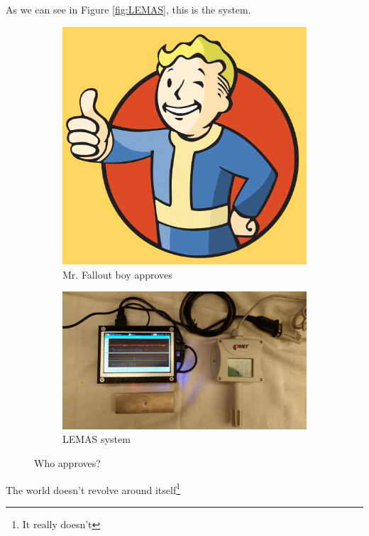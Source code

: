 \documentclass{article}
\begin{document}
  As we can see in Figure \ref{fig:LEMAS}, this is the system.

  \begin{figure}
    \centering
    \begin{subfigure}{0.3\linewidth}
      \includegraphics[width=\linewidth]{figures/fallout.jpeg}
      \caption{Mr. Fallout boy approves}
    \end{subfigure}
    \begin{subfigure}{0.5\linewidth}
      \includegraphics[width=\linewidth]{figures/index.jpeg}
      \caption{LEMAS system}
      \label{fig:2}
    \end{subfigure}
    \caption{Who approves?}
  \end{figure}

  The world doesn't revolve around itself\footnote{\label{foot1}It really doesn't}
\end{document}
